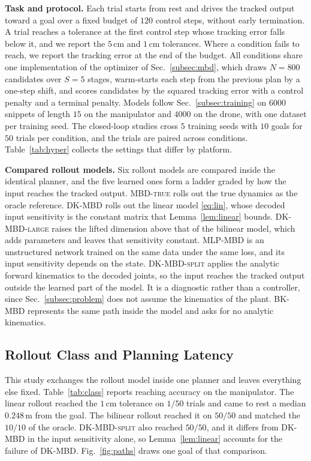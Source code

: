 \documentclass[letterpaper,10pt,conference]{ieeeconf}
\newcommand{\mbdtrue}{\textsc{MBD-true}}
\newcommand{\dkmbd}{\textsc{DK-MBD}}
\newcommand{\dksplit}{\textsc{DK-MBD-split}}
\newcommand{\bkmbd}{\textsc{BK-MBD}}
\newcommand{\dklarge}{\textsc{DK-MBD-large}}
\newcommand{\mlpmbd}{\textsc{MLP-MBD}}
\begin{document}
\textbf{Task and protocol.}
Each trial starts from rest and drives the tracked output toward a goal over a fixed budget of $120$ control steps, without early termination.
A trial reaches a tolerance at the first control step whose tracking error falls below it, and we report the $5$\,cm and $1$\,cm tolerances.
Where a condition fails to reach, we report the tracking error at the end of the budget.
All conditions share one implementation of the optimizer of Sec.~\ref{subsec:mbd}, which draws $N = 800$ candidates over $S = 5$ stages, warm-starts each step from the previous plan by a one-step shift, and scores candidates by the squared tracking error with a control penalty and a terminal penalty.
Models follow Sec.~\ref{subsec:training} on $6000$ snippets of length $15$ on the manipulator and $4000$ on the drone, with one dataset per training seed.
The closed-loop studies cross $5$ training seeds with $10$ goals for $50$ trials per condition, and the trials are paired across conditions.
Table~\ref{tab:hyper} collects the settings that differ by platform.

\textbf{Compared rollout models.}
Six rollout models are compared inside the identical planner, and the five learned ones form a ladder graded by how the input reaches the tracked output.
\mbdtrue{} rolls out the true dynamics as the oracle reference.
\dkmbd{} rolls out the linear model \eqref{eq:lin}, whose decoded input sensitivity is the constant matrix that Lemma~\ref{lem:linear} bounds.
\dklarge{} raises the lifted dimension above that of the bilinear model, which adds parameters and leaves that sensitivity constant.
\mlpmbd{} is an unstructured network trained on the same data under the same loss, and its input sensitivity depends on the state.
\dksplit{} applies the analytic forward kinematics to the decoded joints, so the input reaches the tracked output outside the learned part of the model.
It is a diagnostic rather than a controller, since Sec.~\ref{subsec:problem} does not assume the kinematics of the plant.
\bkmbd{} represents the same path inside the model and asks for no analytic kinematics.

\subsection{Rollout Class and Planning Latency}\label{subsec:exp_class}

This study exchanges the rollout model inside one planner and leaves everything else fixed.
Table~\ref{tab:class} reports reaching accuracy on the manipulator.
The linear rollout reached the $1$\,cm tolerance on $1/50$ trials and came to rest a median $0.248$\,m from the goal.
The bilinear rollout reached it on $50/50$ and matched the $10/10$ of the oracle.
\dksplit{} also reached $50/50$, and it differs from \dkmbd{} in the input sensitivity alone, so Lemma~\ref{lem:linear} accounts for the failure of \dkmbd{}.
Fig.~\ref{fig:paths} draws one goal of that comparison.
\end{document}
